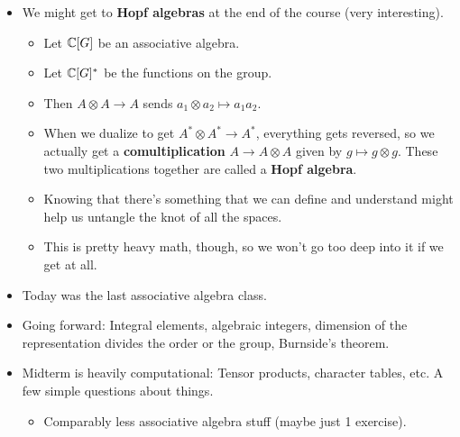 \documentclass[../notes.tex]{subfiles}
\begin{document}
\begin{itemize}
\begin{itemize}
    \end{itemize}
    \item We might get to \textbf{Hopf algebras} at the end of the course (very interesting).
    \begin{itemize}
        \item Let $\mathbb{C}[G]$ be an associative algebra.
        \item Let $\mathbb{C}[G]^*$ be the functions on the group.
        \item Then $A\otimes A\to A$ sends $a_1\otimes a_2\mapsto a_1a_2$.
        \item When we dualize to get $A^*\otimes A^*\to A^*$, everything gets reversed, so we actually get a \textbf{comultiplication} $A\to A\otimes A$ given by $g\mapsto g\otimes g$. These two multiplications together are called a \textbf{Hopf algebra}.
        \item Knowing that there's something that we can define and understand might help us untangle the knot of all the spaces.
        \item This is pretty heavy math, though, so we won't go too deep into it if we get at all.
    \end{itemize}
    \item Today was the last associative algebra class.
    \item Going forward: Integral elements, algebraic integers, dimension of the representation divides the order or the group, Burnside's theorem.
    \item Midterm is heavily computational: Tensor products, character tables, etc. A few simple questions about things.
    \begin{itemize}
        \item Comparably less associative algebra stuff (maybe just 1 exercise).
    \end{itemize}
\end{itemize}
\end{document}
